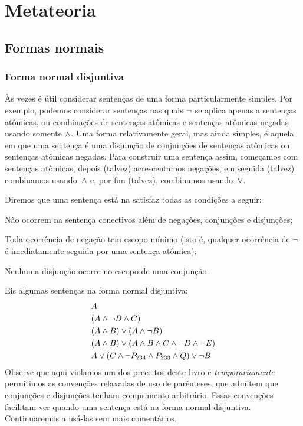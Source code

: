 \part{Metateoria}
\label{ch.normalform}

\chapter{Formas normais}\label{c:NormalForms}


\section{Forma normal disjuntiva}\label{s:DNFDefined}

Às vezes é útil considerar sentenças de uma forma particularmente simples. Por exemplo, podemos considerar sentenças nas quais $\neg$ se aplica apenas a sentenças atômicas, ou combinações de sentenças atômicas e sentenças atômicas negadas usando somente $\wedge$. Uma forma relativamente geral, mas ainda simples, é aquela em que uma sentença é uma disjunção de conjunções de sentenças atômicas ou sentenças atômicas negadas. Para construir uma sentença assim, começamos com sentenças atômicas, depois (talvez) acrescentamos negações, em seguida (talvez) combinamos usando~$\wedge$ e, por fim (talvez), combinamos usando~$\vee$.

Diremos que uma sentença está na  \emph{\ifeff} satisfaz todas as condições a seguir:
	\begin{compactlist}
		\item[(\textsc{dnf1})] Não ocorrem na sentença conectivos além de negações, conjunções e disjunções;
		\item[(\textsc{dnf2})] Toda ocorrência de negação tem escopo mínimo (isto é, qualquer ocorrência de $\neg$ é imediatamente seguida por uma sentença atômica);
		\item[(\textsc{dnf3})] Nenhuma disjunção ocorre no escopo de uma conjunção.
	\end{compactlist}
Eis algumas sentenças na forma normal disjuntiva:
\begin{align*}
  & A \\
  & (A \wedge \lnot B \wedge C)\\
  & (A \wedge B) \vee (A \wedge \neg B)\\
  & (A \wedge B) \vee (A \wedge  B \wedge C \wedge \neg D \wedge \neg E)\\
  & A \vee (C \wedge \neg P_{234} \wedge P_{233} \wedge Q) \vee \neg B
\end{align*}
Observe que aqui violamos um dos preceitos deste livro e \emph{temporariamente} permitimos as convenções relaxadas de uso de parênteses, que admitem que conjunções e disjunções tenham comprimento arbitrário. Essas convenções facilitam ver quando uma sentença está na forma normal disjuntiva. Continuaremos a usá-las sem mais comentários.

